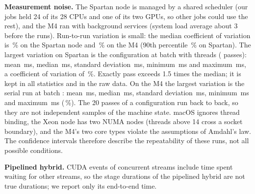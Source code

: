 \textbf{Measurement noise.} The Spartan node is managed by a shared scheduler (our jobs held 24 of its 28 CPUs and one of its two GPUs, so other jobs could use the rest), and the M4 ran with background services (system load average about 3 before the runs). Run-to-run variation is small: the median coefficient of variation is \,\% on the Spartan node and \,\% on the M4 (90th percentile \,\% on Spartan). The largest variation on Spartan is the  configuration at batch  with  threads ( passes): mean \,ms, median \,ms, standard deviation \,ms, minimum \,ms and maximum \,ms, a coefficient of variation of \,\%. Exactly  pass exceeds 1.5 times the median; it is kept in all statistics and in the raw data. On the M4 the largest variation is the serial run at batch : mean \,ms, median \,ms, standard deviation \,ms, minimum \,ms and maximum \,ms (\,\%). The 20 passes of a configuration run back to back, so they are not independent samples of the machine state. macOS ignores thread binding, the Xeon node has two NUMA nodes (threads above 14 cross a socket boundary), and the M4's two core types violate the assumptions of Amdahl's law. The confidence intervals therefore describe the repeatability of these runs, not all possible conditions.

\textbf{Pipelined hybrid.} CUDA events of concurrent streams include time spent waiting for other streams, so the stage durations of the pipelined hybrid are not true durations; we report only its end-to-end time.
